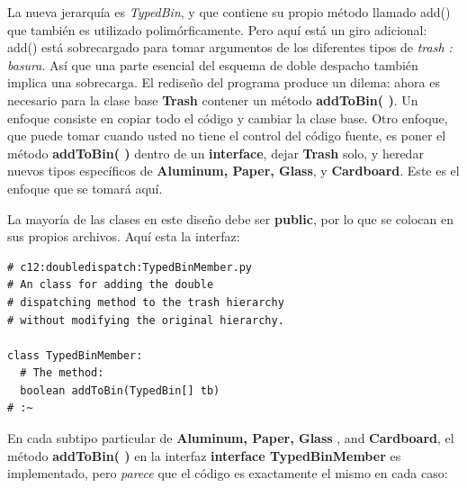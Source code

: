 \documentclass{article}
\begin{document}
\vspace{0.5 cm}
La nueva jerarquía es \textit{TypedBin}, y que contiene su propio método llamado add() que también es utilizado polimórficamente. Pero aquí está un giro adicional: add() está sobrecargado  para tomar argumentos de los diferentes tipos de \textit{trash : basura}. Así que una parte esencial del esquema de doble despacho también implica una sobrecarga. El rediseño del programa produce un dilema: ahora es necesario para la clase base \textbf{Trash} contener un método \textbf{addToBin( )}. Un enfoque consiste en copiar todo el código y cambiar la clase base. Otro enfoque, que puede tomar cuando usted no tiene el control del código fuente, es poner el método \textbf{addToBin( )} dentro de un \textbf{interface}, dejar \textbf{Trash} solo, y heredar nuevos tipos específicos de \textbf{Aluminum, Paper, Glass}, y \textbf{Cardboard}. Este es el enfoque que se tomará aquí.    \newline

La mayoría de las clases en este diseño debe ser \textbf{public}, por lo que se colocan en sus propios archivos. Aquí esta la interfaz:     \newline

\begin{lstlisting} 
# c12:doubledispatch:TypedBinMember.py 
# An class for adding the double  
# dispatching method to the trash hierarchy  
# without modifying the original hierarchy.

class TypedBinMember: 
  # The method: 
  boolean addToBin(TypedBin[] tb) 
# :~ 
\end{lstlisting}

En cada subtipo particular de \textbf{Aluminum, Paper, Glass} , and \textbf{Cardboard}, el método \textbf{addToBin( )} en la interfaz \textbf{interface TypedBinMember} es implementado, pero \textit{parece}  que el código es exactamente el mismo en cada caso:    \newline
\end{document}
